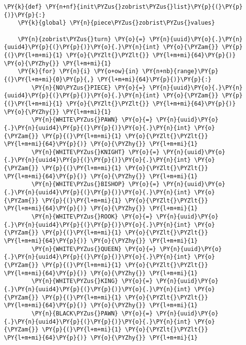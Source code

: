     \begin{tcolorbox}[fontupper=\linespread{.66}\selectfont, breakable, size=fbox, boxrule=1pt, pad at break*=1mm,colback=cellbackground, colframe=cellborder]
\begin{Verbatim}[commandchars=\\\{\}]
\PY{k}{def} \PY{n+nf}{init\PYZus{}zobrist\PYZus{}list}\PY{p}{(}\PY{p}{)}\PY{p}{:}
    \PY{k}{global} \PY{n}{piece\PYZus{}zobrist\PYZus{}values}

    \PY{n}{zobrist\PYZus{}turn} \PY{o}{=} \PY{n}{uuid}\PY{o}{.}\PY{n}{uuid4}\PY{p}{(}\PY{p}{)}\PY{o}{.}\PY{n}{int} \PY{o}{\PYZam{}} \PY{p}{(}\PY{l+m+mi}{1} \PY{o}{\PYZlt{}\PYZlt{}} \PY{l+m+mi}{64}\PY{p}{)} \PY{o}{\PYZhy{}} \PY{l+m+mi}{1}
    \PY{k}{for} \PY{n}{i} \PY{o+ow}{in} \PY{n+nb}{range}\PY{p}{(}\PY{l+m+mi}{0}\PY{p}{,} \PY{l+m+mi}{64}\PY{p}{)}\PY{p}{:}
        \PY{n}{NO\PYZus{}PIECE} \PY{o}{=} \PY{n}{uuid}\PY{o}{.}\PY{n}{uuid4}\PY{p}{(}\PY{p}{)}\PY{o}{.}\PY{n}{int} \PY{o}{\PYZam{}} \PY{p}{(}\PY{l+m+mi}{1} \PY{o}{\PYZlt{}\PYZlt{}} \PY{l+m+mi}{64}\PY{p}{)} \PY{o}{\PYZhy{}} \PY{l+m+mi}{1}
        \PY{n}{WHITE\PYZus{}PAWN} \PY{o}{=} \PY{n}{uuid}\PY{o}{.}\PY{n}{uuid4}\PY{p}{(}\PY{p}{)}\PY{o}{.}\PY{n}{int} \PY{o}{\PYZam{}} \PY{p}{(}\PY{l+m+mi}{1} \PY{o}{\PYZlt{}\PYZlt{}} \PY{l+m+mi}{64}\PY{p}{)} \PY{o}{\PYZhy{}} \PY{l+m+mi}{1}
        \PY{n}{WHITE\PYZus{}KNIGHT} \PY{o}{=} \PY{n}{uuid}\PY{o}{.}\PY{n}{uuid4}\PY{p}{(}\PY{p}{)}\PY{o}{.}\PY{n}{int} \PY{o}{\PYZam{}} \PY{p}{(}\PY{l+m+mi}{1} \PY{o}{\PYZlt{}\PYZlt{}} \PY{l+m+mi}{64}\PY{p}{)} \PY{o}{\PYZhy{}} \PY{l+m+mi}{1}
        \PY{n}{WHITE\PYZus{}BISHOP} \PY{o}{=} \PY{n}{uuid}\PY{o}{.}\PY{n}{uuid4}\PY{p}{(}\PY{p}{)}\PY{o}{.}\PY{n}{int} \PY{o}{\PYZam{}} \PY{p}{(}\PY{l+m+mi}{1} \PY{o}{\PYZlt{}\PYZlt{}} \PY{l+m+mi}{64}\PY{p}{)} \PY{o}{\PYZhy{}} \PY{l+m+mi}{1}
        \PY{n}{WHITE\PYZus{}ROOK} \PY{o}{=} \PY{n}{uuid}\PY{o}{.}\PY{n}{uuid4}\PY{p}{(}\PY{p}{)}\PY{o}{.}\PY{n}{int} \PY{o}{\PYZam{}} \PY{p}{(}\PY{l+m+mi}{1} \PY{o}{\PYZlt{}\PYZlt{}} \PY{l+m+mi}{64}\PY{p}{)} \PY{o}{\PYZhy{}} \PY{l+m+mi}{1}
        \PY{n}{WHITE\PYZus{}QUEEN} \PY{o}{=} \PY{n}{uuid}\PY{o}{.}\PY{n}{uuid4}\PY{p}{(}\PY{p}{)}\PY{o}{.}\PY{n}{int} \PY{o}{\PYZam{}} \PY{p}{(}\PY{l+m+mi}{1} \PY{o}{\PYZlt{}\PYZlt{}} \PY{l+m+mi}{64}\PY{p}{)} \PY{o}{\PYZhy{}} \PY{l+m+mi}{1}
        \PY{n}{WHITE\PYZus{}KING} \PY{o}{=} \PY{n}{uuid}\PY{o}{.}\PY{n}{uuid4}\PY{p}{(}\PY{p}{)}\PY{o}{.}\PY{n}{int} \PY{o}{\PYZam{}} \PY{p}{(}\PY{l+m+mi}{1} \PY{o}{\PYZlt{}\PYZlt{}} \PY{l+m+mi}{64}\PY{p}{)} \PY{o}{\PYZhy{}} \PY{l+m+mi}{1}
        \PY{n}{BLACK\PYZus{}PAWN} \PY{o}{=} \PY{n}{uuid}\PY{o}{.}\PY{n}{uuid4}\PY{p}{(}\PY{p}{)}\PY{o}{.}\PY{n}{int} \PY{o}{\PYZam{}} \PY{p}{(}\PY{l+m+mi}{1} \PY{o}{\PYZlt{}\PYZlt{}} \PY{l+m+mi}{64}\PY{p}{)} \PY{o}{\PYZhy{}} \PY{l+m+mi}{1}

\end{Verbatim}
\end{tcolorbox}
